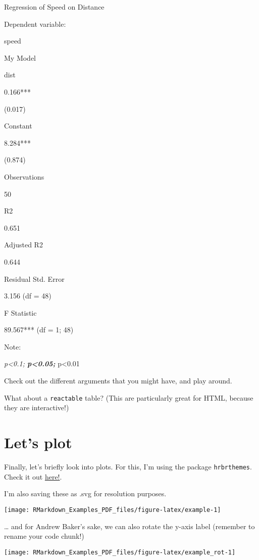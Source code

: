 \documentclass[
]{article}
\begin{document}
Regression of Speed on Distance

Dependent variable:

speed

My Model

dist

0.166***

(0.017)

Constant

8.284***

(0.874)

Observations

50

R2

0.651

Adjusted R2

0.644

Residual Std. Error

3.156 (df = 48)

F Statistic

89.567*** (df = 1; 48)

Note:

\emph{p\textless0.1; \textbf{p\textless0.05; }}p\textless0.01

Check out the different arguments that you might have, and play around.

What about a \texttt{reactable} table? (This are particularly great for
HTML, because they are interactive!)

\hypertarget{lets-plot}{%
\section{Let's plot}\label{lets-plot}}

Finally, let's briefly look into plots. For this, I'm using the package
\texttt{hrbrthemes}. Check it out
\href{https://github.com/hrbrmstr/hrbrthemes}{here!}.

I'm also saving these as .svg for resolution purposes.

\begin{center}\texttt{[image: RMarkdown\_Examples\_PDF\_files/figure-latex/example-1]} \end{center}

\ldots{} and for Andrew Baker's sake, we can also rotate the y-axis
label (remember to rename your code chunk!)

\begin{center}\texttt{[image: RMarkdown\_Examples\_PDF\_files/figure-latex/example\_rot-1]} \end{center}
\end{document}
